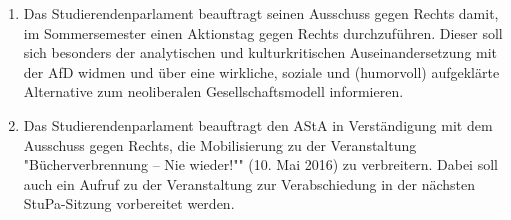 \documentclass[ngerman,headheight=70pt]{scrartcl}
\begin{document}
    \begin{enumerate}
        \item Das Studierendenparlament beauftragt seinen Ausschuss gegen Rechts
        damit, im Sommersemester einen Aktionstag gegen Rechts durchzuführen.
        Dieser soll sich besonders der analytischen und kulturkritischen
        Auseinandersetzung mit der AfD widmen und über eine wirkliche, soziale und
        (humorvoll) aufgeklärte Alternative zum neoliberalen Gesellschaftsmodell
        informieren.
        \item Das Studierendenparlament beauftragt den AStA in Verständigung mit
        dem Ausschuss gegen Rechts, die Mobilisierung zu der Veranstaltung
        "Bücherverbrennung – Nie wieder!"" (10. Mai 2016) zu verbreitern. Dabei
        soll auch ein Aufruf zu der Veranstaltung zur Verabschiedung in der
        nächsten StuPa-Sitzung vorbereitet werden.
    \end{enumerate}
\end{document}
